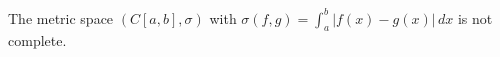 The metric space $(C[a,b], \sigma)$ with $\sigma(f,g) = \int_a^b |f(x) - g(x)|\,dx$ is not complete.
